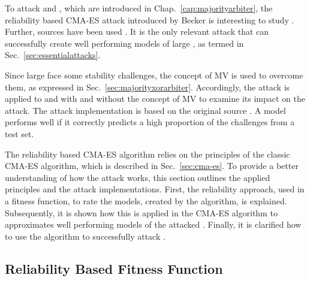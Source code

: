 To attack \mpufs and \mxpufs, which are introduced in Chap.\ \ref{cap:majorityarbiter}, the reliability based \ac{CMA-ES} attack introduced by Becker is interesting to study \cite{Becker2015ThePUFs}.
Further, sources have been used \cite{Becker2015ThePUFs,Hansen2011TheTutorial, Hansen2006TheReview}. %
It is the only relevant attack that can successfully create well performing models of large \xpufs, as termed in Sec.\ \ref{sec:essentialattacks}.

Since large \xpufs face some stability challenges, the concept of \ac{MV} is used to overcome them, as expressed in Sec.\ \ref{sec:majorityxorarbiter}.
Accordingly, the attack is applied to \apufs and \xpufs with and without the concept of \ac{MV} to examine its impact on the attack. %
The attack implementation is based on the original source \cite{Becker2015ThePUFs}.
A model performs well if it correctly predicts a high proportion of the challenges from a test set.

The reliability based \ac{CMA-ES} algorithm relies on the principles of the classic \ac{CMA-ES} algorithm, which is described in Sec.\ \ref{sec:cma-es}.
To provide a better understanding of how the attack works, this section outlines the applied principles and the attack implementations. %
First, the reliability approach, used in a fitness function, to rate the models, created by the algorithm, is explained.
Subsequently, it is shown how this is applied in the \ac{CMA-ES} algorithm to approximates well performing models of the attacked \apuf.
Finally, it is clarified how to use the algorithm to successfully attack \xpufs.


\subsection{Reliability Based Fitness Function}
\label{sec:reliability}

